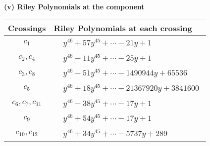 \documentclass[1p]{elsarticle_modified}
\theoremstyle{definition}
\begin{document}
\newpage\renewcommand{\arraystretch}{1}
\flushleft \textbf{(v) Riley Polynomials at the component}\newline \\
\begin{tabular}{m{50pt}|m{274pt}}
Crossings & \hspace{64pt}Riley Polynomials at each crossing \\
\hline $$\begin{aligned}c_{1}\end{aligned}$$&$\begin{aligned}
&y^{46}+57 y^{45}+\cdots-21 y+1
\end{aligned}$\\
\hline $$\begin{aligned}c_{2},c_{4}\end{aligned}$$&$\begin{aligned}
&y^{46}-11 y^{45}+\cdots-25 y+1
\end{aligned}$\\
\hline $$\begin{aligned}c_{3},c_{8}\end{aligned}$$&$\begin{aligned}
&y^{46}-51 y^{45}+\cdots-1490944 y+65536
\end{aligned}$\\
\hline $$\begin{aligned}c_{5}\end{aligned}$$&$\begin{aligned}
&y^{46}+18 y^{45}+\cdots-21367920 y+3841600
\end{aligned}$\\
\hline $$\begin{aligned}c_{6},c_{7},c_{11}\end{aligned}$$&$\begin{aligned}
&y^{46}-38 y^{45}+\cdots-17 y+1
\end{aligned}$\\
\hline $$\begin{aligned}c_{9}\end{aligned}$$&$\begin{aligned}
&y^{46}+54 y^{45}+\cdots-17 y+1
\end{aligned}$\\
\hline $$\begin{aligned}c_{10},c_{12}\end{aligned}$$&$\begin{aligned}
&y^{46}+34 y^{45}+\cdots-5737 y+289
\end{aligned}$\\
\hline
\end{tabular}\\~\\
\end{document}
